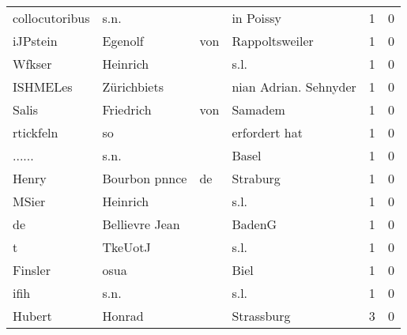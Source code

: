 \begin{tabular}{llllrr}
           collocutoribus &                               s.n. &             &                                   in Poissy &          1 &         0 \\
                 iJPstein &                            Egenolf &         von &                              Rappoltsweiler &          1 &         0 \\
                   Wfkser &                           Heinrich &             &                                        s.l. &          1 &         0 \\
                 ISHMELes &                        Zürichbiets &             &                       nian Adrian. Sehnyder &          1 &         0 \\
                    Salis &                          Friedrich &         von &                                     Samadem &          1 &         0 \\
                rtickfeln &                                 so &             &                               erfordert hat &          1 &         0 \\
                   ...... &                               s.n. &             &                                       Basel &          1 &         0 \\
                    Henry &                      Bourbon pnnce &          de &                                    Straburg &          1 &         0 \\
                    MSier &                           Heinrich &             &                                        s.l. &          1 &         0 \\
                       de &                     Bellievre Jean &             &                                      BadenG &          1 &         0 \\
                        t &                            TkeUotJ &             &                                        s.l. &          1 &         0 \\
                  Finsler &                               osua &             &                                        Biel &          1 &         0 \\
                     ifih &                               s.n. &             &                                        s.l. &          1 &         0 \\
                   Hubert &                             Honrad &             &                                  Strassburg &          3 &         0 \\

\end{tabular}
